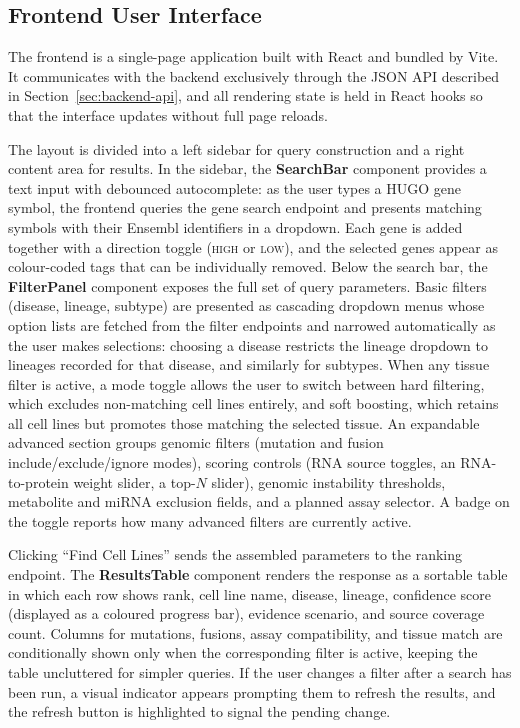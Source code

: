 \subsection{Frontend User Interface}
\label{sec:frontend-ui}

The frontend is a single-page application built with React and bundled by Vite. It communicates with the backend exclusively through the JSON API described in Section~\ref{sec:backend-api}, and all rendering state is held in React hooks so that the interface updates without full page reloads.

The layout is divided into a left sidebar for query construction and a right content area for results. In the sidebar, the \textbf{SearchBar} component provides a text input with debounced autocomplete: as the user types a HUGO gene symbol, the frontend queries the gene search endpoint and presents matching symbols with their Ensembl identifiers in a dropdown. Each gene is added together with a direction toggle (\textsc{high} or \textsc{low}), and the selected genes appear as colour-coded tags that can be individually removed. Below the search bar, the \textbf{FilterPanel} component exposes the full set of query parameters. Basic filters (disease, lineage, subtype) are presented as cascading dropdown menus whose option lists are fetched from the filter endpoints and narrowed automatically as the user makes selections: choosing a disease restricts the lineage dropdown to lineages recorded for that disease, and similarly for subtypes. When any tissue filter is active, a mode toggle allows the user to switch between hard filtering, which excludes non-matching cell lines entirely, and soft boosting, which retains all cell lines but promotes those matching the selected tissue. An expandable advanced section groups genomic filters (mutation and fusion include/exclude/ignore modes), scoring controls (RNA source toggles, an RNA-to-protein weight slider, a top-$N$ slider), genomic instability thresholds, metabolite and miRNA exclusion fields, and a planned assay selector. A badge on the toggle reports how many advanced filters are currently active.

Clicking ``Find Cell Lines'' sends the assembled parameters to the ranking endpoint. The \textbf{ResultsTable} component renders the response as a sortable table in which each row shows rank, cell line name, disease, lineage, confidence score (displayed as a coloured progress bar), evidence scenario, and source coverage count. Columns for mutations, fusions, assay compatibility, and tissue match are conditionally shown only when the corresponding filter is active, keeping the table uncluttered for simpler queries. If the user changes a filter after a search has been run, a visual indicator appears prompting them to refresh the results, and the refresh button is highlighted to signal the pending change.

